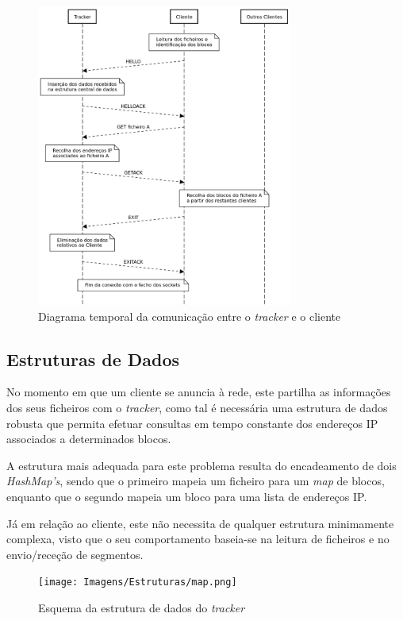         \begin{figure}[hb!]
            \centering
            \includegraphics[width=0.75\textwidth]{Imagens/Diagramas Temporais/tracker.png}
            \caption{Diagrama temporal da comunicação entre o \textit{tracker} e o cliente}
        \end{figure}

    \subsection{Estruturas de Dados}

        No momento em que um cliente se anuncia à rede, este partilha as informações dos seus ficheiros com o \textit{tracker}, como tal é necessária uma estrutura de dados robusta que permita efetuar consultas em tempo constante dos endereços IP associados a determinados blocos.

        A estrutura mais adequada para este problema resulta do encadeamento de dois \textit{HashMap's}, sendo que o primeiro mapeia um ficheiro para um \textit{map} de blocos, enquanto que o segundo mapeia um bloco para uma lista de endereços IP.

        Já em relação ao cliente, este não necessita de qualquer estrutura minimamente complexa, visto que o seu comportamento baseia-se na leitura de ficheiros e no envio/receção de segmentos.

        \begin{figure}[hb!]
            \centering
            \texttt{[image: Imagens/Estruturas/map.png]}
            \caption{Esquema da estrutura de dados do \textit{tracker}}
            \label{fig:enter-label}
        \end{figure}